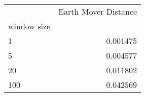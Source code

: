 \begin{tabular}{lr}
\toprule
{} &  Earth Mover Distance \\
window size &                       \\
\midrule
1           &              0.001475 \\
5           &              0.004577 \\
20          &              0.011802 \\
100         &              0.042569 \\
\bottomrule
\end{tabular}
